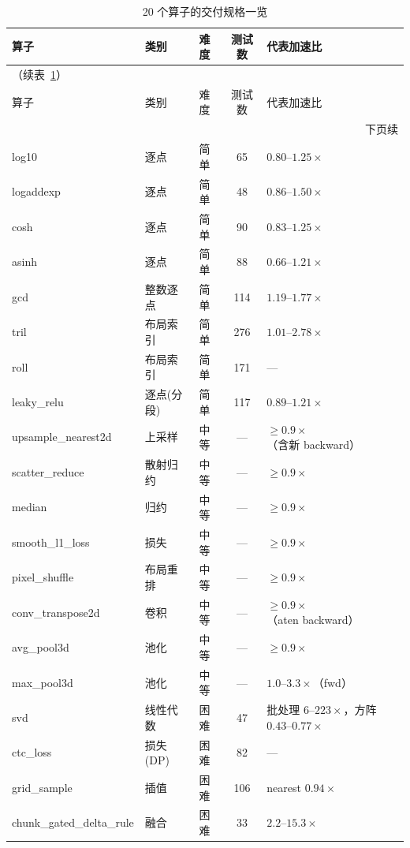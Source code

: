 \begin{small}
\begin{longtable}{lllcl}
\caption{20 个算子的交付规格一览}\label{tab:ops20}\\
\toprule
算子 & 类别 & 难度 & 测试数 & 代表加速比 \\
\midrule
\endfirsthead
\multicolumn{5}{l}{\small（续表~\ref{tab:ops20}）}\\ \toprule
算子 & 类别 & 难度 & 测试数 & 代表加速比 \\ \midrule
\endhead
\midrule \multicolumn{5}{r}{\small 下页续}\\
\endfoot
\bottomrule
\endlastfoot
log10 & 逐点 & 简单 & 65 & $0.80\text{--}1.25\times$ \\
logaddexp & 逐点 & 简单 & 48 & $0.86\text{--}1.50\times$ \\
cosh & 逐点 & 简单 & 90 & $0.83\text{--}1.25\times$ \\
asinh & 逐点 & 简单 & 88 & $0.66\text{--}1.21\times$ \\
gcd & 整数逐点 & 简单 & 114 & $1.19\text{--}1.77\times$ \\
tril & 布局索引 & 简单 & 276 & $1.01\text{--}2.78\times$ \\
roll & 布局索引 & 简单 & 171 & — \\
leaky\_relu & 逐点(分段) & 简单 & 117 & $0.89\text{--}1.21\times$ \\
\midrule
upsample\_nearest2d & 上采样 & 中等 & — & $\geqslant 0.9\times$（含新 backward）\\
scatter\_reduce & 散射归约 & 中等 & — & $\geqslant 0.9\times$ \\
median & 归约 & 中等 & — & $\geqslant 0.9\times$ \\
smooth\_l1\_loss & 损失 & 中等 & — & $\geqslant 0.9\times$ \\
pixel\_shuffle & 布局重排 & 中等 & — & $\geqslant 0.9\times$ \\
conv\_transpose2d & 卷积 & 中等 & — & $\geqslant 0.9\times$（aten backward）\\
avg\_pool3d & 池化 & 中等 & — & $\geqslant 0.9\times$ \\
max\_pool3d & 池化 & 中等 & — & $1.0\text{--}3.3\times$（fwd）\\
\midrule
svd & 线性代数 & 困难 & 47 & 批处理 $6\text{--}223\times$，方阵 $0.43\text{--}0.77\times$ \\
ctc\_loss & 损失(DP) & 困难 & 82 & — \\
grid\_sample & 插值 & 困难 & 106 & nearest $0.94\times$ \\
chunk\_gated\_delta\_rule & 融合 & 困难 & 33 & $2.2\text{--}15.3\times$ \\
\end{longtable}
\end{small}


